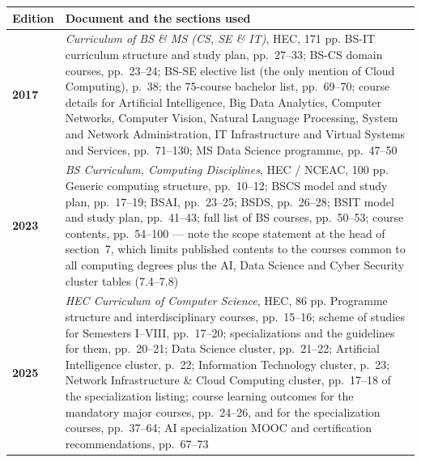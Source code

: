 \documentclass[11pt,a4paper,oneside]{report}
\begin{document}
\begin{longtable}{@{}L{3.4cm}L{12.4cm}@{}}
\toprule
{}
\textbf{Edition} & \textbf{Document and the sections used} \\
\midrule
\endhead
\textbf{\color{ed2017}2017} &
\emph{Curriculum of BS \& MS (CS, SE \& IT)}, HEC, 171 pp.
BS-IT curriculum structure and study plan, pp.\ 27--33; BS-CS domain courses,
pp.\ 23--24; BS-SE elective list (the only mention of Cloud Computing), p.\ 38;
the 75-course bachelor list, pp.\ 69--70; course details for Artificial
Intelligence, Big Data Analytics, Computer Networks, Computer Vision, Natural
Language Processing, System and Network Administration, IT Infrastructure and
Virtual Systems and Services, pp.\ 71--130; MS Data Science programme,
pp.\ 47--50 \\
\textbf{\color{ed2023}2023} &
\emph{BS Curriculum, Computing Disciplines}, HEC / NCEAC, 100 pp.
Generic computing structure, pp.\ 10--12; BSCS model and study plan, pp.\ 17--19;
BSAI, pp.\ 23--25; BSDS, pp.\ 26--28; BSIT model and study plan, pp.\ 41--43;
full list of BS courses, pp.\ 50--53; course contents, pp.\ 54--100 --- note the
scope statement at the head of section~7, which limits published contents to the
courses common to all computing degrees plus the AI, Data Science and Cyber
Security cluster tables (7.4--7.8) \\
\textbf{\color{ed2025}2025} &
\emph{HEC Curriculum of Computer Science}, HEC, 86 pp.
Programme structure and interdisciplinary courses, pp.\ 15--16; scheme of studies
for Semesters I--VIII, pp.\ 17--20; specializations and the guidelines for them,
pp.\ 20--21; Data Science cluster, pp.\ 21--22; Artificial Intelligence cluster,
p.\ 22; Information Technology cluster, p.\ 23; Network Infrastructure \& Cloud
Computing cluster, pp.\ 17--18 of the specialization listing; course learning
outcomes for the mandatory major courses, pp.\ 24--26, and for the specialization
courses, pp.\ 37--64; AI specialization MOOC and certification recommendations,
pp.\ 67--73 \\
\bottomrule
\end{longtable}
\end{document}
